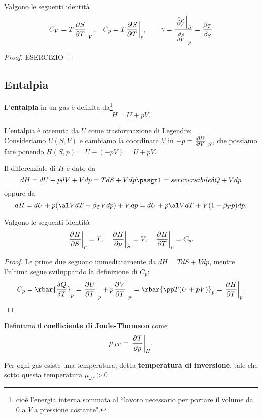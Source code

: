 \begin{remark}
Valgono le seguenti identit\`a
\[C_V=T\ppb TSV,\quad C_p=T\ppb TSp,\qquad \gamma=\frac{\ppb VpS}{\ppb Vpp}=\frac{\beta_T}{\beta_S}\]
\end{remark}
\begin{proof}
ESERCIZIO
\end{proof}





\subsection{Entalpia}



\begin{definition}[Entalpia]
L'\textbf{entalpia} in un gas \`e definita da\footnote{cio\`e l'energia interna sommata al ``lavoro necessario per portare il volume da $0$ a $V$ a pressione costante".}
\[H=U+pV.\]
\end{definition}

\begin{remark}
L'entalpia \`e ottenuta da $U$ come trasformazione di Legendre:\\
Consideriamo $U(S,V)$ e cambiamo la coordinata $V$ in $-p=\ppb VUS$, che possiamo fare ponendo $H(S,p)=U-(-pV)=U+pV$.
\end{remark}

\begin{remark}
Il differenziale di $H$ \`e dato da
\[dH=dU+pdV+Vdp=TdS+Vdp\pasgnl={se reversibile}\delta Q+Vdp\]
oppure da
\[dH=dU+p(\al VdT-\beta_T Vdp)+Vdp=dU+p\al VdT+V(1-\beta_Tp)dp.\]
\end{remark}
\begin{corollary}
Valgono le seguenti identit\`a
\[\ppb SHp=T,\quad \ppb pHS=V,\quad \ppb THp=C_p.\]
\end{corollary}
\begin{proof}
Le prime due seguono immediatamente da $dH=TdS+Vdp$, mentre l'ultima segue sviluppando la definizione di $C_p$:
\[C_p=\rbar{\frac{\delta Q}{\delta T}}_p=\ppb TUp+p\ppb TVp=\rbar{\pp T{}(U+pV)}_p=\ppb THp.\]
\end{proof}




\begin{definition}
Definiamo il \textbf{coefficiente di Joule-Thomson} come
\[\mu_{JT}=\ppb pTH.\]
\end{definition}
\begin{fact}
Per ogni gas esiste una temperatura, detta \textbf{temperatura di inversione}, tale che sotto questa temperatura $\mu_{JT}>0$
\end{fact}




